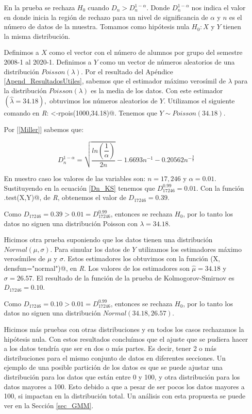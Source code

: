 En la prueba se rechaza $H_{0}$ cuando $D_{n} > D_{n}^{1-\alpha}$. Donde $D_{n}^{1-\alpha}$ nos indica el valor en donde inicia la región de rechazo para un nivel de significancia de $\alpha$ y $n$ es el número de datos de la muestra. Tomamos como hipótesis nula $H_{0}: X$ y $Y$ tienen la misma distribución.

Definimos a $X$ como el vector con el número de alumnos por grupo del semestre 2008-1 al 2020-1. Definimos a $Y$ como un vector de números aleatorios de una distribución $Poisson(\lambda)$. Por el resultado del Apéndice \ref{Apend_ResultadosUtiles}, sabemos que el estimador máximo verosímil de $\lambda$ para la distribución $Poisson(\lambda)$ es la media de los datos. Con este estimador $(\hat{\lambda} = 34.18),$ obtuvimos los números aleatorios de $Y$. Utilizamos el siguiente comando en \textit{R}: \verb@Y<-rpois(1000,34.18)@. Tenemos que $Y \sim Poisson(34.18)$.%

Por [\ref{Miller}] sabemos que:
  
  \begin{equation}\label{Dn_KS}
D_{n}^{1-\alpha} = \sqrt{\dfrac{ln \left(\dfrac{1}{\alpha}\right)}{2n}} - 1.6693 n^{-1} - 0.20562 n^{-\frac{3}{2}}
\end{equation}

En nuestro caso los valores de las variables son: $n = 17,246$ y $\alpha = 0.01$. Sustituyendo en la ecuación \ref{Dn_KS} tenemos que $D_{17246}^{0.99} = 0.01$. Con la función \verb@ks.test(X,Y)@, de \textit{R}, obtenemos el valor de $D_{17246} = 0.39$.

Como $D_{17246} = 0.39 > 0.01 = D_{17246}^{0.99}$, entonces se rechaza $H_{0}$, por lo tanto los datos no siguen una distribución Poisson con $\lambda = 34.18$.


Hicimos otra prueba suponiendo que los datos tienen una distribución $Normal(\mu,\sigma)$. Para simular los datos de $Y$ utilizamos los estimadores máximo verosímiles de $\mu$ y $\sigma$. Estos estimadores los obtuvimos con la función \verb@fitdistr(X, densfun="normal")@, en \textit{R}. Los valores de los estimadores son $\hat{\mu} = 34.18$ y $\hat{\sigma} = 26.57$. El resultado de la función de la prueba de Kolmogorov-Smirnov es $D_{17246} = 0.10$.

Como $D_{17246} = 0.10 > 0.01 = D_{17246}^{0.99}$, entonces se rechaza $H_{0}$, por lo tanto los datos no siguen una distribución $Normal(34.18,26.57)$.

Hicimos más pruebas con otras distribuciones y en todos los casos rechazamos la hipótesis nula. Con estos resultados concluímos que el ajuste que se pudiera hacer a los datos tendría que ser en dos o más partes. Es decir, tener 2 o más distribuciones para el mismo conjunto de datos en diferentes secciones. Un ejemplo de una posible partición de los datos es que se puede ajustar una distribución para los datos que están entre 0 y 100, y otra distribución para los datos mayores a 100. Esto debido a que a pesar de ser pocos los datos mayores a 100, si impactan en la distribución total. Un análisis con esta propuesta se puede ver en la Sección \ref{sec_GMM}.

